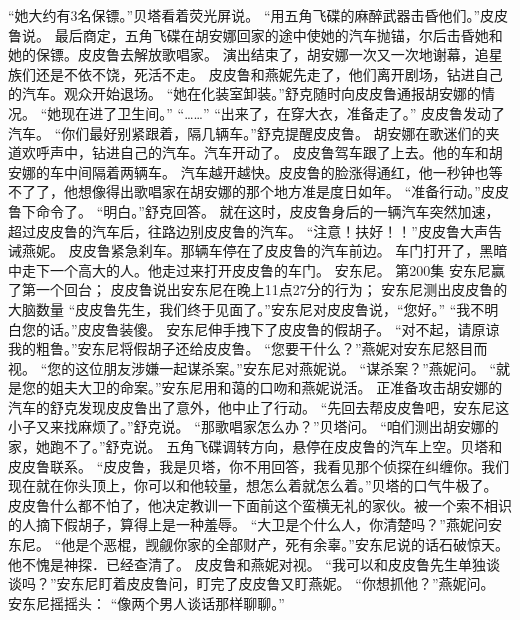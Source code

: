 \documentclass[a4paper,12pt,UTF8,twoside]{ctexbook}
\begin{document}
        “她大约有3名保镖。”贝塔看着荧光屏说。 
        “用五角飞碟的麻醉武器击昏他们。”皮皮鲁说。 
        最后商定，五角飞碟在胡安娜回家的途中使她的汽车抛锚，尔后击昏她和她的保镖。皮皮鲁去解放歌唱家。 
        演出结束了，胡安娜一次又一次地谢幕，追星族们还是不依不饶，死活不走。 
        皮皮鲁和燕妮先走了，他们离开剧场，钻进自己的汽车。观众开始退场。 
        “她在化装室卸装。”舒克随时向皮皮鲁通报胡安娜的情况。 
        “她现在进了卫生间。” 
        “……” 
        “出来了，在穿大衣，准备走了。” 
        皮皮鲁发动了汽车。 
        “你们最好别紧跟着，隔几辆车。”舒克提醒皮皮鲁。 
        胡安娜在歌迷们的夹道欢呼声中，钻进自己的汽车。汽车开动了。 
        皮皮鲁驾车跟了上去。他的车和胡安娜的车中间隔着两辆车。 
        汽车越开越快。皮皮鲁的脸涨得通红，他一秒钟也等不了了，他想像得出歌唱家在胡安娜的那个地方准是度日如年。 
        “准备行动。”皮皮鲁下命令了。 
        “明白。”舒克回答。 
        就在这时，皮皮鲁身后的一辆汽车突然加速，超过皮皮鲁的汽车后，往路边别皮皮鲁的汽车。 
        “注意！扶好！！”皮皮鲁大声告诫燕妮。 
        皮皮鲁紧急刹车。那辆车停在了皮皮鲁的汽车前边。 
        车门打开了，黑暗中走下一个高大的人。他走过来打开皮皮鲁的车门。 
        安东尼。   第200集 
        安东尼赢了第一个回台； 
        皮皮鲁说出安东尼在晚上11点27分的行为； 
        安东尼测出皮皮鲁的大脑数量   
        “皮皮鲁先生，我们终于见面了。”安东尼对皮皮鲁说，“您好。” 
        “我不明白您的话。”皮皮鲁装傻。 
        安东尼伸手拽下了皮皮鲁的假胡子。 
        “对不起，请原谅我的粗鲁。”安东尼将假胡子还给皮皮鲁。 
        “您要干什么？”燕妮对安东尼怒目而视。 
        “您的这位朋友涉嫌一起谋杀案。”安东尼对燕妮说。 
      “谋杀案？”燕妮问。 
      “就是您的姐夫大卫的命案。”安东尼用和蔼的口吻和燕妮说活。 
        正准备攻击胡安娜的汽车的舒克发现皮皮鲁出了意外，他中止了行动。 
        “先回去帮皮皮鲁吧，安东尼这小子又来找麻烦了。”舒克说。 
        “那歌唱家怎么办？”贝塔问。 
        “咱们测出胡安娜的家，她跑不了。”舒克说。 
        五角飞碟调转方向，悬停在皮皮鲁的汽车上空。贝塔和皮皮鲁联系。 
        “皮皮鲁，我是贝塔，你不用回答，我看见那个侦探在纠缠你。我们现在就在你头顶上，你可以和他较量，想怎么着就怎么着。”贝塔的口气牛极了。 
        皮皮鲁什么都不怕了，他决定教训一下面前这个蛮横无礼的家伙。被一个索不相识的人摘下假胡子，算得上是一种羞辱。 
        “大卫是个什么人，你清楚吗？”燕妮问安东尼。 
        “他是个恶棍，觊觎你家的全部财产，死有余辜。”安东尼说的话石破惊天。他不愧是神探．已经查清了。 
        皮皮鲁和燕妮对视。 
        “我可以和皮皮鲁先生单独谈谈吗？”安东尼盯着皮皮鲁问，盯完了皮皮鲁又盯燕妮。 
        “你想抓他？”燕妮问。 
        安东尼摇摇头： 
        “像两个男人谈话那样聊聊。” 
\end{document}
